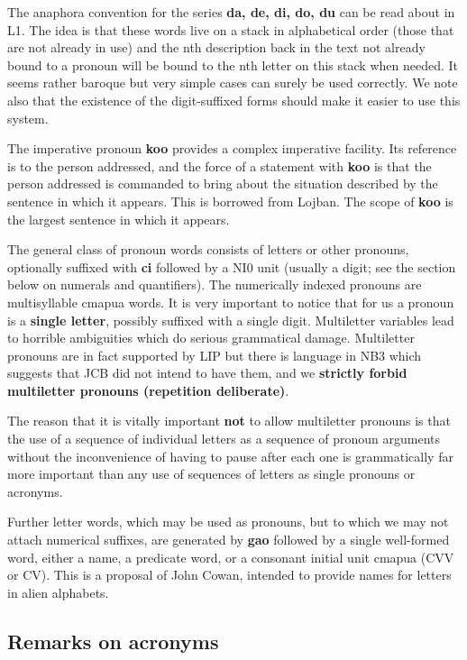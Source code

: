 \documentclass[12pt]{book}
\begin{document}
The anaphora convention for the series {\bf da, de, di, do, du} can be read about in L1.  The idea is that these words live on a stack in alphabetical order (those that are not already in use) and the nth description back in the text not already bound to a pronoun will be bound to the nth letter on this stack when needed.   It seems rather baroque but very simple cases can surely be used correctly.  We note also that the existence of the digit-suffixed forms should make it easier to use this system.

The imperative pronoun {\bf koo} provides a complex imperative facility.  Its reference is to the person addressed, and the force of a statement with {\bf koo} is that the person addressed is commanded to bring about the situation described by the sentence in which it appears.  This is borrowed from Lojban.  The scope of {\bf koo} is the largest sentence in which it appears.

The general class of pronoun words consists of letters or other pronouns, optionally suffixed with {\bf ci} followed by a NI0 unit (usually a digit; see the section below on numerals and quantifiers).     The numerically indexed pronouns are multisyllable cmapua words.  It is very important
to notice that for us a pronoun is a {\bf single letter}, possibly suffixed with a single digit.  Multiletter variables lead to horrible ambiguities which do serious grammatical damage.
Multiletter pronouns are in fact supported by LIP but there is language in NB3 which suggests that JCB did not intend to have them, and we {\bf strictly forbid multiletter pronouns (repetition deliberate)}.

The reason that it is vitally important {\bf not} to allow multiletter pronouns is that the use of a sequence of individual letters as a sequence of pronoun arguments without the inconvenience of having to pause after each one is grammatically far more important than any use of sequences of letters as single pronouns or acronyms.

Further letter words, which may be used as pronouns, but to which we may not attach numerical suffixes, are generated by {\bf gao} followed by a single well-formed word, either a name, a predicate word, or a consonant initial unit cmapua (CVV or CV).
This is a proposal of John Cowan, intended to provide names for letters in alien alphabets.



\subsection{Remarks on acronyms}
\end{document}
